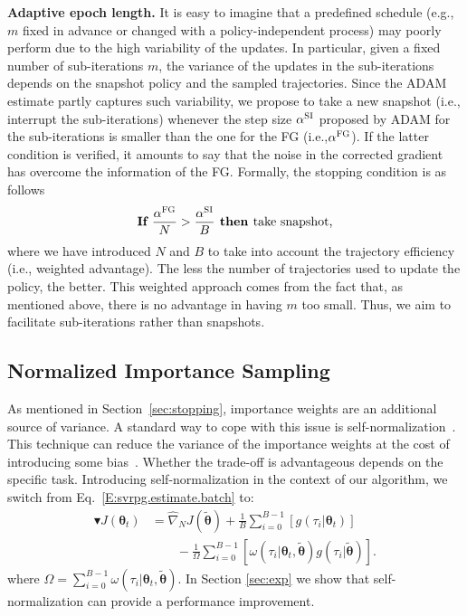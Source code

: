 \documentclass{article}
\makeatletter
\theoremstyle{remark}
\theoremstyle{definition}
\DeclareRobustCommand{\eg}{e.g.,\@\xspace}
\DeclareRobustCommand{\ie}{i.e.,\@\xspace}
\newcommand{\vtheta}{\boldsymbol{\theta}}
\newcommand{\wt}[1]{\widetilde{#1}}
\newcommand{\wh}[1]{\widehat{#1}}
\makeatother
\begin{document}
\textbf{Adaptive epoch length.}
It is easy to imagine that a predefined schedule (\eg $m$ fixed in advance or changed with a policy-independent process) may poorly perform due to the high variability of the updates.
In particular, given a fixed number of sub-iterations $m$, the variance of the updates in the sub-iterations depends on the snapshot policy and the sampled trajectories.
Since the ADAM estimate partly captures such variability,  we propose to take a new snapshot (\ie interrupt the sub-iterations) whenever the step size $\alpha^{\textsc{SI}}$ proposed by ADAM for the sub-iterations is smaller than the one for the FG (\ie $\alpha^{\textsc{FG}}$).
If the latter condition is verified, it amounts to say that the noise in the corrected gradient has overcome the information of the FG.
Formally, the stopping condition is as follows
\[
        \textbf{If }        \frac{\alpha^{\textsc{FG}}}{N} > \frac{\alpha^{\textsc{SI}}}{B} \textbf{ then } \text{take snapshot,}
\]
where we have introduced $N$ and $B$ to take into account the trajectory efficiency (\ie weighted advantage).
The less the number of trajectories used to update the policy, the better.
This weighted approach comes from the fact that, as mentioned above, there is no advantage in having $m$ too small.
Thus, we aim to facilitate sub-iterations rather than snapshots.

\subsection{Normalized Importance Sampling}\label{sec:prac}
As mentioned in Section~\ref{sec:stopping}, importance weights are an additional source of variance. A standard way to cope with this issue is self-normalization~\citep[\eg][]{precup2000eligibility,owenmcbook}.
This technique can reduce the variance of the importance weights at the cost of introducing some bias~\citep[][Chapter 9]{owenmcbook}.
Whether the trade-off is advantageous depends on the specific task.  
Introducing self-normalization in the context of our algorithm, we switch from Eq.~\eqref{E:svrpg.estimate.batch} to:
\begin{align*}
        \blacktriangledown J(\vtheta_{t}) &= \wh{\nabla}_N J(\wt{\vtheta}) + \frac{1}{B} \sum_{i=0}^{B-1} \left[g(\tau_i|\vtheta_t)\right]\\ 
                                          &\qquad{} - \frac{1}{\Omega} \sum_{i=0}^{B-1} \left[ \omega(\tau_i|\vtheta_t, \wt{\vtheta}) g(\tau_i|\wt{\vtheta})
\right].
\end{align*}
where $\Omega = \sum_{i=0}^{B-1}\omega(\tau_i|\vtheta_t, \wt{\vtheta})$.
In Section \ref{sec:exp} we show that self-normalization can provide a performance improvement.
\end{document}
